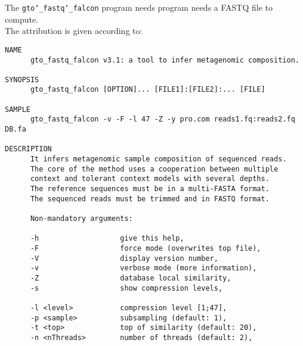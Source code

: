 The \texttt{gto\char`_fastq\char`_falcon} program needs program needs a FASTQ file to compute.\\
The attribution is given according to:
\begin{lstlisting}
NAME                                                                     
      gto_fastq_falcon v3.1: a tool to infer metagenomic composition.            
                                                                         
SYNOPSIS                                                                 
      gto_fastq_falcon [OPTION]... [FILE1]:[FILE2]:... [FILE]                      
                                                                         
SAMPLE                                                                   
      gto_fastq_falcon -v -F -l 47 -Z -y pro.com reads1.fq:reads2.fq DB.fa         
                                                                         
DESCRIPTION                                                              
      It infers metagenomic sample composition of sequenced reads.       
      The core of the method uses a cooperation between multiple         
      context and tolerant context models with several depths.           
      The reference sequences must be in a multi-FASTA format.           
      The sequenced reads must be trimmed and in FASTQ format.           
                                                                         
      Non-mandatory arguments:                                           
                                                                         
      -h                   give this help,                               
      -F                   force mode (overwrites top file),             
      -V                   display version number,                       
      -v                   verbose mode (more information),              
      -Z                   database local similarity,                    
      -s                   show compression levels,                      
                                                                         
      -l <level>           compression level [1;47],                    
      -p <sample>          subsampling (default: 1),                    
      -t <top>             top of similarity (default: 20),              
      -n <nThreads>        number of threads (default: 2),              
                                                                         

\end{lstlisting}
